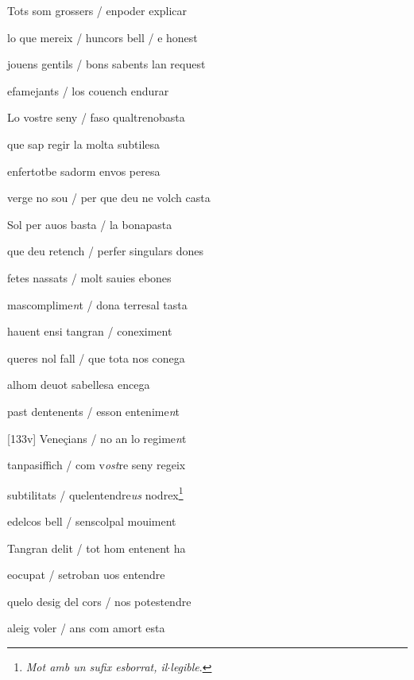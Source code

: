 \documentclass[12pt]{article}
\begin{document}
\begin{estrofa}

 Tots som grossers / enpoder explicar

 lo que mereix / huncors bell / e honest

 jouens gentils / bons sabents lan request

 efamejants / los couench endurar

 Lo vostre seny / faso qualtrenobasta

 que sap regir la molta subtilesa

 enfertotbe sadorm envos peresa

 verge no sou / per que deu ne volch casta

\end{estrofa}



\begin{estrofa}

 Sol per auos basta / la bonapasta

 que deu retench / perfer singulars dones

 fetes nassats / molt sauies ebones

 mascomplime\textit{n}t / dona terresal tasta

 hauent ensi tangran / coneximent

 queres nol fall / que tota nos conega

 alhom deuot sabellesa encega

 past dentenents / esson entenime\textit{n}t

\end{estrofa}



\begin{estrofa}

 [133v] Vene\c{c}ians / no an lo regime\textit{n}t

 tanpasiffich / com v\textit{ost}re seny regeix

 subtilitats / quelentendre\textit{us} nodrex\footnote{\textit{Mot amb un sufix
esborrat, il$\cdot{}$legible}.}

 edelcos bell / senscolpal mouiment

 Tangran delit / tot hom entenent ha

 eocupat / setroban uos entendre

 quelo desig del cors / nos potestendre

 aleig voler / ans com amort esta

\end{estrofa}
\end{document}
